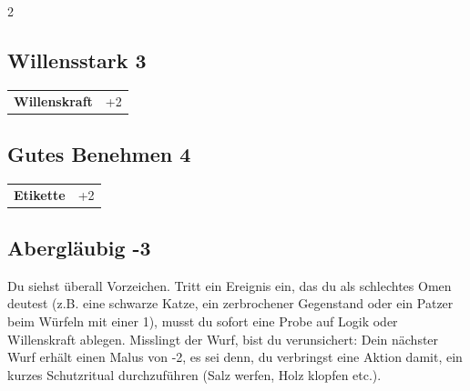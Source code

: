 \begin{multicols}{2}
\begin{tcolorbox}

\end{tcolorbox}

\begin{tcolorbox}
    \subsection*{Willensstark \hfill \small{3 }}
    \tcblower




\begin{tabular}{@{}ll@{}}
    \textbf{Willenskraft} & +2\\
\end{tabular}


\end{tcolorbox}

\begin{tcolorbox}
    \subsection*{Gutes Benehmen \hfill \small{4 }}
    \tcblower




\begin{tabular}{@{}ll@{}}
    \textbf{Etikette} & +2\\
\end{tabular}


\end{tcolorbox}

\begin{tcolorbox}
    \subsection*{Abergläubig \hfill \small{-3 }}
    \tcblower
Du siehst überall Vorzeichen. Tritt ein Ereignis ein, das du als schlechtes Omen deutest (z.B. eine schwarze Katze, ein zerbrochener Gegenstand oder ein Patzer beim Würfeln mit einer 1), musst du sofort eine Probe auf Logik oder Willenskraft ablegen. Misslingt der Wurf, bist du verunsichert: Dein nächster Wurf erhält einen Malus von -2, es sei denn, du verbringst eine Aktion damit, ein kurzes Schutzritual durchzuführen (Salz werfen, Holz klopfen etc.).


\end{tcolorbox}
\end{multicols}
